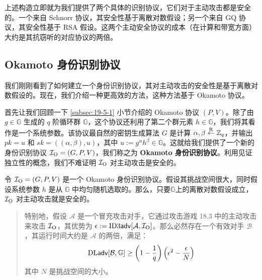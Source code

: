 \begin{snote}[具体的实例化.]
	上述构造立即就为我们提供了两个具体的识别协议，它们对于主动攻击都是安全的。一个来自 Schnorr 协议，其安全性基于离散对数假设；另一个来自 GQ 协议，其安全性基于 RSA 假设。这两个主动安全协议的成本（在计算和带宽方面）大约是其抗窃听的对应协议的两倍。
\end{snote}

\subsection{Okamoto 身份识别协议}

我们刚刚看到了如何建立一个身份识别协议，其对主动攻击的安全性是基于离散对数假设的。现在，我们介绍一种更高效的方法，这种方法基于 Okamoto 协议。

首先让我们回顾一下 \ref{subsec:19-5-1} 小节介绍的 Okamoto 协议 $(P,V)$。除了由 $g\in\mathbb{G}$ 生成的 $q$ 阶循环群 $\mathbb{G}$，这个协议还利用了第二个群元素 $h\in\mathbb{G}$，我们将其看作是一个系统参数。该协议最自然的密钥生成算法 $G$ 是计算 $\alpha,\beta\overset{\rm R}\leftarrow\mathbb{Z}_q$，并输出 $pk=u$ 和 $sk=((\alpha,\beta),u)$，其中 $u:=g^\alpha h^\beta\in\mathbb{G}$。这就给我们提供了一个新的身份识别协议 $\mathcal{I}_{\rm O}=(G,P,V)$，我们称之为 \textbf{Okamoto 身份识别协议}。利用见证独立性的概念，我们不难证明 $\mathcal{I}_{\rm O}$ 对主动攻击是安全的。

\begin{theorem}\label{theo:19-23}
令 $\mathcal{I}_{\rm O}=(G,P,V)$ 是一个 Okamoto 身份识别协议。假设其挑战空间很大，同时假设系统参数 $h$ 是从 $\mathbb{G}$ 中均匀随机选取的。那么，只要$\mathbb{G}$上的离散对数假设成立，$\mathcal{I}_{\rm O}$ 对主动攻击就是安全的。
\begin{quote}
特别地，假设 $\mathcal{A}$ 是一个冒充攻击对手，它通过攻击游戏 18.3 中的主动攻击来攻击 $\mathcal{I}_{\rm O}$，其优势为 $\epsilon:={\rm ID3\mathsf{adv}}[\mathcal{A},\mathcal{I}_{\rm O}]$。那么必然存在一个有效对手 $\mathcal{B}$，其运行时间大约是 $\mathcal{A}$ 的两倍，满足：
$$
{\rm DL\mathsf{adv}}[\mathcal{B},\mathbb{G}]\geq\left(1-\frac{1}{q}\right)\left(\epsilon^2-\frac{\epsilon}{N}\right)
$$
其中 $N$ 是挑战空间的大小。
\end{quote}
\end{theorem}


